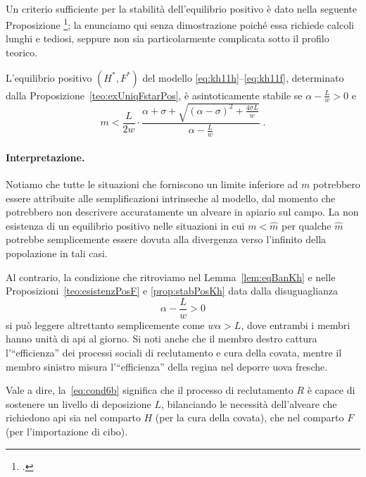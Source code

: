 \paragraph{}
Un criterio sufficiente per la stabilità dell'equilibrio positivo è dato nella seguente Proposizione
\footcite[3]{khoury2011}; la enunciamo qui senza dimostrazione poiché essa richiede calcoli lunghi e tediosi,
seppure non sia particolarmente complicata sotto il profilo teorico.

\begin{proposizione}
L'equilibrio positivo $(H^*, F^*)$ del modello \eqref{eq:kh11h}--\eqref{eq:kh11f}, determinato
dalla Proposizione~\ref{teo:exUniqFstarPos},
è asintoticamente stabile se $\alpha -\frac{L}{w} >0$ e
$$m < \frac{L}{2w} \cdot \frac{ \alpha + \sigma + \sqrt{ {(\alpha - \sigma)}^2 +\frac{4 \sigma L}{w}  } }
    {\alpha -\frac{L}{w}} \; .$$
    \label{prop:stabPosKh}
\end{proposizione}

\paragraph{Interpretazione.}
\label{par:interpretationCond6b}
Notiamo che tutte le situazioni che forniscono un limite inferiore ad $m$ potrebbero essere attribuite alle
semplificazioni intrinseche al modello, dal momento che potrebbero non descrivere accuratamente un alveare
in apiario sul campo. La non esistenza di un equilibrio positivo nelle situazioni in cui
$m< \hat{m}$ per qualche $\hat{m}$ potrebbe semplicemente essere dovuta alla divergenza verso l'infinito
della popolazione in tali casi.

Al contrario, la condizione che ritroviamo nel Lemma~\ref{lem:eqBanKh} e nelle Proposizioni~\ref{teo:esistenzPosF}
e \ref{prop:stabPosKh} data dalla disuguaglianza
\begin{equation}
\alpha - \frac{L}{w} > 0
    \label{eq:cond6b}
\end{equation}
si può leggere altrettanto semplicemente come $w \alpha >L$, dove entrambi i membri hanno unità di api al giorno.
Si noti anche che il membro destro cattura l'``efficienza'' dei processi sociali di reclutamento e cura della
covata, mentre il membro sinistro misura l'``efficienza'' della regina nel deporre uova fresche.

Vale a dire, la~\eqref{eq:cond6b} significa che il processo di reclutamento $R$ è capace
di sostenere un livello di deposizione $L$, bilanciando le necessità dell'alveare che richiedono api sia nel
comparto $H$ (per la cura della covata), che nel comparto $F$ (per l'importazione di cibo).

